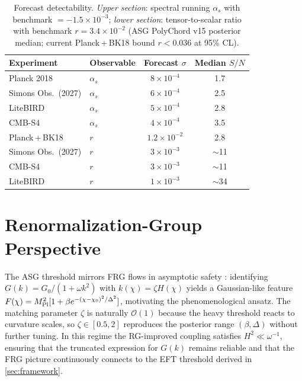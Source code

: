 \documentclass[11pt,a4paper]{article}
\begin{document}
\begin{table}[t]
    \centering
    \caption{Forecast detectability. \emph{Upper section}: spectral running $\alpha_s$ with benchmark $=-1.5\times10^{-3}$; \emph{lower section}: tensor-to-scalar ratio with benchmark $r=3.4\times10^{-2}$ (ASG PolyChord v15 posterior median; current Planck\,+\,BK18 bound $r<0.036$ at 95\% CL).}
    \begin{tabular}{llcc}
        \toprule
        Experiment & Observable & Forecast $\sigma$ & Median $S/N$ \\
        \midrule
        Planck 2018          & $\alpha_{s}$ & $8\times10^{-4}$ & 1.7 \\
        Simons Obs.\ (2027)  & $\alpha_{s}$ & $6\times10^{-4}$ & 2.5 \\
        LiteBIRD             & $\alpha_{s}$ & $5\times10^{-4}$ & 2.8 \\
        CMB-S4               & $\alpha_{s}$ & $4\times10^{-4}$ & 3.5 \\
        \midrule
        Planck\,+\,BK18      & $r$         & $1.2\times10^{-2}$ & 2.8 \\
        Simons Obs.\ (2027)  & $r$         & $3\times10^{-3}$   & $\sim$11 \\
        CMB-S4               & $r$         & $3\times10^{-3}$   & $\sim$11 \\
        LiteBIRD             & $r$         & $1\times10^{-3}$   & $\sim$34 \\
        \bottomrule
    \end{tabular}
    \label{tab:forecasts}
\end{table}

\section{Renormalization-Group Perspective}
\label{sec:rg}
The ASG threshold mirrors FRG flows in asymptotic safety \cite{Saueressig2023}: identifying $G(k)=G_{0}/(1+\omega k^{2})$ with $k(\chi)=\zeta H(\chi)$ yields a Gaussian-like feature $F(\chi)=M_{\rm Pl}^{2}[1+\beta e^{-(\chi-\chi_{0})^{2}/\Delta^{2}}]$, motivating the phenomenological ansatz. The matching parameter $\zeta$ is naturally $\mathcal{O}(1)$ because the heavy threshold reacts to curvature scales, so $\zeta\in[0.5,2]$ reproduces the posterior range $(\beta,\Delta)$ without further tuning. In this regime the RG-improved coupling satisfies $H^{2}\ll \omega^{-1}$, ensuring that the truncated expression for $G(k)$ remains reliable and that the FRG picture continuously connects to the EFT threshold derived in \cref{sec:framework}.
\end{document}
